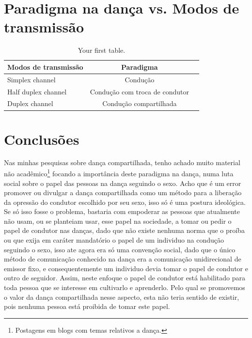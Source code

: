 \documentclass[a4paper,10pt]{article}
\begin{document}
\section{Paradigma na dança vs. Modos de transmissão}

\begin{table}[h!]
  \begin{center}
    \caption{Your first table.}
    \label{tab:table1}
    \begin{tabular}{|l|c|r|} %
    \hline
      Modos de transmissão & Paradigma \\ \hline \hline
      Simplex channel & Condução  \\ \hline
      Half duplex channel & Condução com troca de condutor \\ \hline
      Duplex channel & Condução compartilhada \\ \hline
    \end{tabular}
  \end{center}
\end{table}


\section{Conclusões}
Nas minhas pesquisas sobre dança compartilhada, 
tenho achado muito material não 
acadêmico\footnote{Postagens em blogs com temas relativos a dança.} 
focando a importância deste paradigma na dança, 
numa luta social sobre o papel das pessoas na dança seguindo o sexo.
Acho que é um error promover ou divulgar a dança compartilhada 
como um método para a liberação da opressão do condutor escolhido por seu sexo, 
isso só é uma postura ideológica. 
Se só isso fosse o problema, 
bastaria com empoderar as pessoas que atualmente não usam, 
ou se planteiam usar, esse papel na sociedade, 
a tomar ou pedir o papel de condutor nas danças, 
dado que não existe nenhuma norma que o proíba  
ou que exija em caráter mandatório o papel de um individuo na condução seguindo o sexo,
isso ate agora era só uma convenção social, 
dado que o único método de comunicação conhecido na dança era a comunicação unidirecional de emissor fixo,
e consequentemente um individuo devia tomar o papel de condutor e outro de seguidor. 
Assim, neste enfoque o papel de condutor está habilitado para toda pessoa que se interesse em 
cultivarlo e aprenderlo. 
Pelo qual se promovemos o valor da dança compartilhada nesse aspecto, 
esta não teria sentido de existir, 
pois nenhuma pessoa está proibida de tomar este papel.
\end{document}
